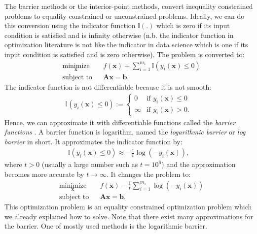 \documentclass[lang=cn,10pt]{gorgeousnbook}
\numberwithin{equation}{section}%
\numberwithin{figure}{section}%
\begin{document}
The barrier methods or the interior-point methods, convert inequality constrained problems to equality constrained or unconstrained problems. Ideally, we can do this conversion using the indicator function $\mathbb{I}(.)$ which is zero if its input condition is satisfied and is infinity otherwise (n.b. the indicator function in optimization literature is not like the indicator in data science which is one if its input condition is satisfied and is zero otherwise). The problem is converted to:
\begin{equation}\label{equation_log_barrier_optimization}
\begin{aligned}
& \underset{\boldsymbol{x}}{\text{minimize}}
& & f(\boldsymbol{x}) + \sum_{i=1}^{m_1} \mathbb{I}(y_i(\boldsymbol{x}) \leq 0) \\
& \text{subject to}
& & \boldsymbol{A} \boldsymbol{x} = \boldsymbol{b}.
\end{aligned}
\end{equation}
The indicator function is not differentiable because it is not smooth: 
\begin{align}
\mathbb{I}(y_i(\boldsymbol{x}) \leq 0) := 
\left\{
    \begin{array}{ll}
        0 & \mbox{if } y_i(\boldsymbol{x}) \leq 0 \\
        \infty & \mbox{if } y_i(\boldsymbol{x}) > 0.
    \end{array}
\right.
\end{align}
Hence, we can approximate it with differentiable functions called the \textit{barrier functions} \cite{boyd2004convex,nesterov2018lectures}.
A barrier function is logarithm, named the \textit{logarithmic barrier} or \textit{log barrier} in short. It approximates the indicator function by:
\begin{align}\label{equation_log_barrier}
\mathbb{I}(y_i(\boldsymbol{x}) \leq 0) \approx -\frac{1}{t} \log(-y_i(\boldsymbol{x})),
\end{align}
where $t > 0$ (usually a large number such as $t = 10^6$) and the approximation becomes more accurate by $t \rightarrow \infty$.
It changes the problem to:
\begin{equation}\label{equation_log_barrier_optimization_withLogBarrier}
\begin{aligned}
& \underset{\boldsymbol{x}}{\text{minimize}}
& & f(\boldsymbol{x}) - \frac{1}{t} \sum_{i=1}^{m_1} \log(-y_i(\boldsymbol{x})) \\
& \text{subject to}
& & \boldsymbol{A} \boldsymbol{x} = \boldsymbol{b}.
\end{aligned}
\end{equation}
This optimization problem is an equality constrained optimization problem which we already explained how to solve. 
Note that there exist many approximations for the barrier. One of mostly used methods is the logarithmic barrier.  
\end{document}
